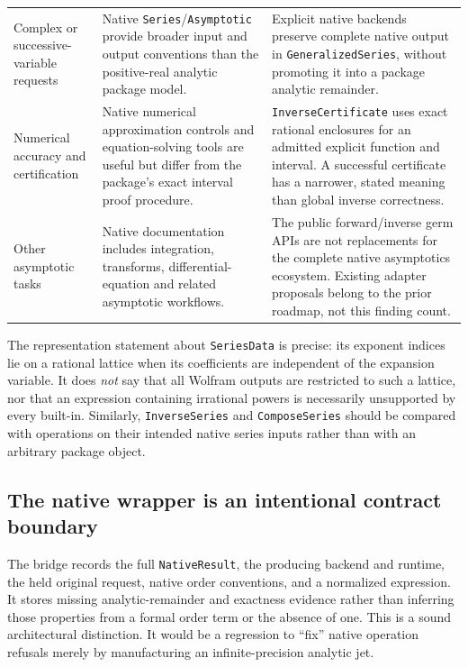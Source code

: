 \documentclass[11pt]{article}
\newcommand{\code}[1]{\texttt{#1}}
\begin{document}
\begin{longtable}{@{}P{3.0cm}P{5.5cm}P{6.3cm}@{}}
Complex or successive-variable requests & Native \code{Series}/\code{Asymptotic} provide broader input and output conventions than the positive-real analytic package model. & Explicit native backends preserve complete native output in \code{GeneralizedSeries}, without promoting it into a package analytic remainder.\\[0.6em]
Numerical accuracy and certification & Native numerical approximation controls and equation-solving tools are useful but differ from the package's exact interval proof procedure. & \code{InverseCertificate} uses exact rational enclosures for an admitted explicit function and interval. A successful certificate has a narrower, stated meaning than global inverse correctness.\\[0.6em]
Other asymptotic tasks & Native documentation includes integration, transforms, differential-equation and related asymptotic workflows. & The public forward/inverse germ APIs are not replacements for the complete native asymptotics ecosystem. Existing adapter proposals belong to the prior roadmap, not this finding count.\\
\bottomrule
\end{longtable}

The representation statement about \code{SeriesData} is precise: its exponent indices lie on a rational lattice when its coefficients are independent of the expansion variable. It does \emph{not} say that all Wolfram outputs are restricted to such a lattice, nor that an expression containing irrational powers is necessarily unsupported by every built-in. Similarly, \code{InverseSeries} and \code{ComposeSeries} should be compared with operations on their intended native series inputs rather than with an arbitrary package object.\cite{wlseriesdata,wlinverse,wlcompose}

\subsection{The native wrapper is an intentional contract boundary}
The bridge records the full \code{NativeResult}, the producing backend and runtime, the held original request, native order conventions, and a normalized expression. It stores missing analytic-remainder and exactness evidence rather than inferring those properties from a formal order term or the absence of one. This is a sound architectural distinction. It would be a regression to ``fix'' native operation refusals merely by manufacturing an infinite-precision analytic jet.\cite{bridge,contracts}
\end{document}
